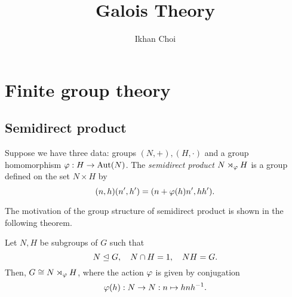 \documentclass{../note}
\begin{document}
\title{Galois Theory}
\author{Ikhan Choi}
\maketitle
\tableofcontents





\part{Finite group theory}
\iffalse
presentation
	quotient of a free group
	homomorphism 잡기
		free group을 정의역으로 먼저 잡고 well-defined 보여서 quotient로 내리기
	element들을 두 제너레이터로 표현하기
isomorphism 보이기
	isomorphism theorem
	order argument
subgroup criterion: 항등원, 역원, 닫힘 순으로 증명
centralizer, center, normalizer
	각 그룹의 계산 -> 기본적으로 노가다, 마지막에 라그랑지 확인
	센트럴라이저의 대칭성
	N(H)/C(H) 정리, G/Z(G)=Inn(G)
stabilizer


----------
#
아벨군: 순환군, n-abelian 등 여러 조건, 기본정리
대칭군: 생성원, 트랜지티브, 교대군과 부호
콕세터: 이면군, 프레젠테이션
선형군: 

#
액션, 실로우: existence, congruence condition
부분군격자: 1. 특정위수 부분군의 존재성, 2. 각 부분군의 컨쥬게이트 개수
	노멀라이저의 크기를 잰다는 것 = 실로우군의 conjugate 개수 세는 것
	- 카운팅: 너무 많은 conjugate 배제하는 법
	- 인덱스: 푸앵카레 정리, least prime ind
	- 노말라이즈되는 부분군 잡아 노말라이저 띄우기
	케이스 나누기에 매우 좋은 조건을 제공
		노말 실로우 -> 바로 반직접곱
http://oeis.org/wiki/Number_of_groups_of_order_n

#
군 확장
컴포지션 시리즈의 이해
반직접: / 계산->아벨군의 자기동형군
중심적: 군코호몰로지 / 계산->보편계수정리

#
단순군: 단순군 아니기 테크닉, 단순군 보이기 테크닉, 교대군과 리타입 선형군

#
p군: 비자명센터, 개수 겁나많음
닐포턴트: 피팅, 프라티니
솔버블?
센트럴 시리즈?


\fi


\chapter{Semidirect product}
\begin{defn}
Suppose we have three data: groups $(N,+),(H,\cdot)$ and a group homomorphism $\varphi:H\to\operatorname{Aut}(N)$.
The \emph{semidirect product} $N\rtimes_\varphi H$ is a group defined on the set $N\times H$ by
\[(n,h)(n',h')=(n+\varphi(h)n',hh').\]
\end{defn}
The motivation of the group structure of semidirect product is shown in the following theorem.
\begin{thm}
Let $N,H$ be subgroups of $G$ such that
\[N\trianglelefteq G,\quad N\cap H=1,\quad NH=G.\]
Then, $G\cong N\rtimes_\varphi H$, where the action $\varphi$ is given by conjugation
\[\varphi(h):N\to N:n\mapsto hnh^{-1}.\]
\end{thm}
\end{document}
